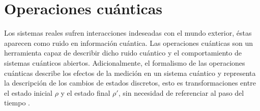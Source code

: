 
\section{Operaciones cuánticas}\label{OpCuanticas}

Los sistemas reales sufren interacciones indeseadas con el mundo exterior, éstas aparecen como ruido en información cuántica. Las operaciones cuánticas son un herramienta capaz de describir dicho ruido cuántico y el comportamiento de sistemas cuánticos abiertos.  Adicionalmente, el formalismo de las operaciones cuánticas describe los efectos de la medición en un sistema cuántico y representa la descripción de los cambios  de estados discretos, esto es transformaciones entre el estado inicial $\rho$ y el estado final $\rho'$, sin necesidad de referenciar al paso del tiempo
{\cite{nielsen_chuang_2010}}.

